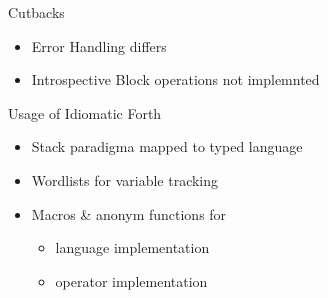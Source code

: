 \documentclass{beamer}
\begin{document}
\begin{frame}
    Cutbacks
    \begin{itemize}
    \item Error Handling differs
    \item Introspective Block operations not implemnted
    \end{itemize}
\end{frame}


\begin{frame}
    Usage of Idiomatic Forth
    \begin{itemize}
    \item Stack paradigma mapped to typed language
    \item Wordlists for variable tracking 
    \item Macros \& anonym functions for 
        \begin{itemize}
            \item language implementation
            \item operator implementation
        \end{itemize}
    \end{itemize}
\end{frame}
\end{document}
